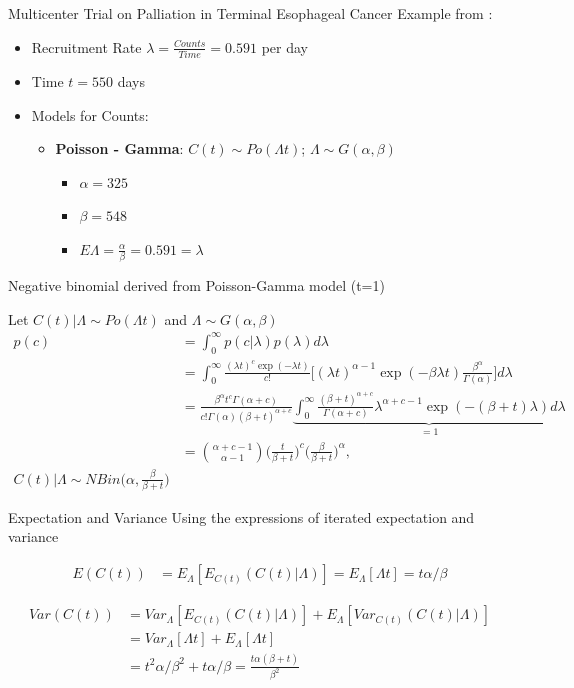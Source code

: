 \documentclass[english]{beamer}\usepackage[]{graphicx}\usepackage[]{xcolor}
\begin{document}
\begin{frame}{Multicenter Trial on Palliation in Terminal Esophageal Cancer}
Example from \cite{carter2004application}:
\begin{itemize}
\item Recruitment Rate $\lambda = \frac{Counts}{Time} = 0.591$ per day
\item Time $t = 550$ days
\item Models for Counts:
	\begin{itemize}
	\item \textbf{Poisson - Gamma}: $C(t) \sim Po (\Lambda t)$; $\Lambda \sim G(\alpha,\beta)$
		\begin{itemize}
		\item $\alpha = 325$
		\item $\beta = 548$
		\item $E \Lambda = \frac{\alpha}{\beta} = 0.591 = \lambda$
		\end{itemize}
	\end{itemize}
\end{itemize}
\end{frame}

\begin{frame}[shrink = 5]{Negative binomial derived from Poisson-Gamma model (t=1)}

Let $C(t)|\Lambda \sim Po(\Lambda t)$ and $\Lambda \sim G(\alpha,\beta)$
\begin{align*}
p(c)&=\int^\infty_0 p(c|\lambda) p(\lambda) d\lambda\\
&=\int^\infty_0 \frac{(\lambda t)^c\exp(-\lambda t)}{c!}\Bigg[(\lambda t)^{\alpha-1}\exp(-\beta\lambda t)\frac{\beta^\alpha}{\Gamma(\alpha)}\Bigg]d\lambda\\
&=\frac{\beta^\alpha t^c \Gamma(\alpha+c)}{c!\Gamma(\alpha) (\beta+t)^{\alpha+c}}\underbrace{\int^\infty_0 \frac{(\beta+t)^{\alpha+c}}{\Gamma(\alpha+c)} \lambda^{\alpha+c-1}\exp(-(\beta+t)\lambda)d\lambda}_{=1}\\
&=\binom{\alpha+c-1}{\alpha-1}\Bigg (\frac{t}{\beta+t}\Bigg)^{c} \Bigg(\frac{\beta}{\beta+t}\Bigg)^{\alpha}, \\
C(t)|\Lambda\sim NBin \Bigg(\alpha, \frac{\beta}{\beta+t}\Bigg)
\end{align*}
\end{frame}


\begin{frame}{Expectation and Variance}
Using the expressions of iterated expectation and variance \citep{held2014applied}

\begin{align*}
E(C(t)) &= E_{\Lambda}[E_{C(t)} (C(t)|\Lambda)] = E_{\Lambda}[\Lambda t] = t\alpha/\beta
\end{align*}

\begin{align*}
Var(C(t)) &= Var_{\Lambda}[E_{C(t)} (C(t)|\Lambda)] + E_{\Lambda}[Var_{C(t)}(C(t)|\Lambda)]\\
&=Var_{\Lambda}[\Lambda t] + E_{\Lambda}[\Lambda t] \\
&=t^2\alpha/\beta^2 + t\alpha/\beta = \frac{t \alpha(\beta+t)}{\beta^2}
\end{align*}
\end{frame}
\end{document}
